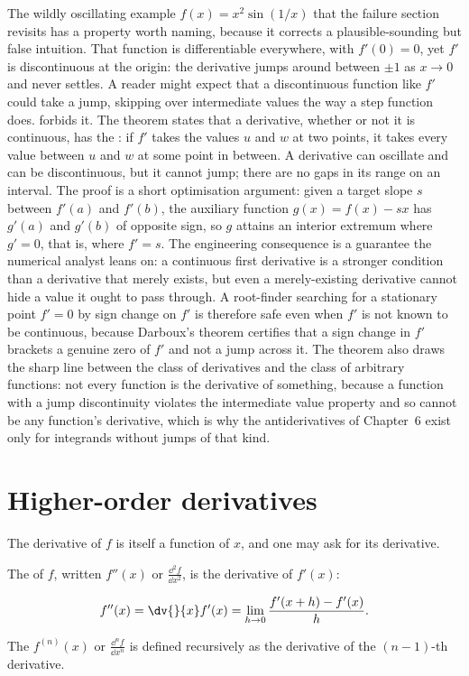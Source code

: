 \begin{mastery}
The wildly oscillating example $f(x) = x^{2}\sin(1/x)$ that the failure
section revisits has a property worth naming, because it corrects a
plausible-sounding but false intuition. That function is differentiable
everywhere, with $f'(0) = 0$, yet $f'$ is discontinuous at the origin:
the derivative jumps around between $\pm 1$ as $x \to 0$ and never
settles. A reader might expect that a discontinuous function like $f'$
could take a jump, skipping over intermediate values the way a step
function does.  forbids it. The theorem
states that a derivative, whether or not it is continuous, has the
: if $f'$ takes the values $u$ and
$w$ at two points, it takes every value between $u$ and $w$ at some
point in between. A derivative can oscillate and can be discontinuous,
but it cannot jump; there are no gaps in its range on an interval. The
proof is a short optimisation argument: given a target slope $s$ between
$f'(a)$ and $f'(b)$, the auxiliary function $g(x) = f(x) - s x$ has
$g'(a)$ and $g'(b)$ of opposite sign, so $g$ attains an interior
extremum where $g'= 0$, that is, where $f' = s$. The engineering
consequence is a guarantee the numerical analyst leans on: a continuous
first derivative is a stronger condition than a derivative that merely
exists, but even a merely-existing derivative cannot hide a value it
ought to pass through. A root-finder searching for a stationary point
$f' = 0$ by sign change on $f'$ is therefore safe even when $f'$ is not
known to be continuous, because Darboux's theorem certifies that a sign
change in $f'$ brackets a genuine zero of $f'$ and not a jump across
it. The theorem also draws the sharp line between the class of
derivatives and the class of arbitrary functions: not every function is
the derivative of something, because a function with a jump
discontinuity violates the intermediate value property and so cannot be
any function's derivative, which is why the antiderivatives of
Chapter~6 exist only for integrands without jumps of that kind.
\end{mastery}

\section{Higher-order derivatives}

The derivative of $f$ is itself a function of $x$, and one may
ask for its derivative.

\begin{definition}
The  of $f$, written $f''(x)$ or
$\frac{\dd^{2} f}{\dd x^{2}}$, is the derivative of $f'(x)$:

\[
f''(x) = \dv{}{x} f'(x) = \lim_{h \to 0} \frac{f'(x + h) -
f'(x)}{h}.
\]

The  $f^{(n)}(x)$ or $\frac{\dd^{n}
f}{\dd x^{n}}$ is defined recursively as the derivative of the
$(n - 1)$-th derivative.
\end{definition}

